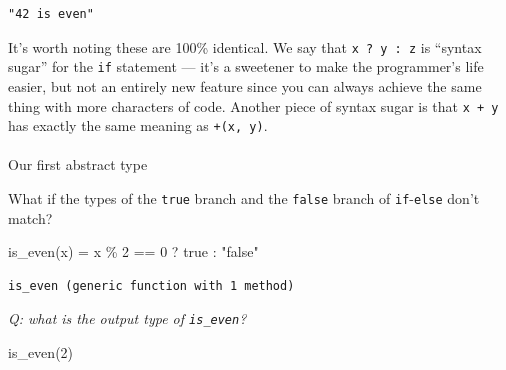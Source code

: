 \documentclass[
]{article}
\makeatletter
\let\oldparagraph\paragraph
\renewcommand{\paragraph}{
    \@ifstar
      \xxxParagraphStar
      \xxxParagraphNoStar
  }
\newcommand{\xxxParagraphStar}[1]{\oldparagraph*{#1}\mbox{}}
\newcommand{\xxxParagraphNoStar}[1]{\oldparagraph{#1}\mbox{}}
\newenvironment{Shaded}{\begin{snugshade}}{\end{snugshade}}
\newcommand{\ConstantTok}[1]{\textcolor[rgb]{0.56,0.35,0.01}{#1}}
\newcommand{\FloatTok}[1]{\textcolor[rgb]{0.68,0.00,0.00}{#1}}
\newcommand{\FunctionTok}[1]{\textcolor[rgb]{0.28,0.35,0.67}{#1}}
\newcommand{\NormalTok}[1]{\textcolor[rgb]{0.00,0.23,0.31}{#1}}
\newcommand{\OperatorTok}[1]{\textcolor[rgb]{0.37,0.37,0.37}{#1}}
\newcommand{\SpecialCharTok}[1]{\textcolor[rgb]{0.37,0.37,0.37}{#1}}
\newcommand{\StringTok}[1]{\textcolor[rgb]{0.13,0.47,0.30}{#1}}
\makeatother
\begin{document}
\begin{Shaded}
\end{Shaded}

\begin{verbatim}
"42 is even"
\end{verbatim}

It's worth noting these are 100\% identical. We say that
\texttt{x\ ?\ y\ :\ z} is ``syntax sugar'' for the \texttt{if} statement
--- it's a sweetener to make the programmer's life easier, but not an
entirely new feature since you can always achieve the same thing with
more characters of code. Another piece of syntax sugar is that
\texttt{x\ +\ y} has exactly the same meaning as \texttt{+(x,\ y)}.

\paragraph{Our first abstract type}\label{our-first-abstract-type}

What if the types of the \texttt{true} branch and the \texttt{false}
branch of \texttt{if}-\texttt{else} don't match?

\begin{Shaded}
\begin{Highlighting}[]
\FunctionTok{is\_even}\NormalTok{(x) }\OperatorTok{=}\NormalTok{ x }\OperatorTok{\%} \FloatTok{2} \OperatorTok{==} \FloatTok{0}\NormalTok{ ? }\ConstantTok{true} \OperatorTok{:} \StringTok{"false"}
\end{Highlighting}
\end{Shaded}

\begin{verbatim}
is_even (generic function with 1 method)
\end{verbatim}

\emph{Q: what is the output type of \texttt{is\_even}?}

\begin{Shaded}
\begin{Highlighting}[]
\FunctionTok{is\_even}\NormalTok{(}\FloatTok{2}\NormalTok{)}
\end{Highlighting}
\end{Shaded}
\end{document}
